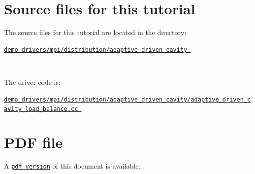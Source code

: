 

\hypertarget{index_sources}{}\section{Source files for this tutorial}\label{index_sources}

\begin{DoxyItemize}
\item The source files for this tutorial are located in the directory\+:~\newline
~\newline
\begin{center} \href{../../../../demo_drivers/mpi/distribution/adaptive_driven_cavity}{\tt demo\+\_\+drivers/mpi/distribution/adaptive\+\_\+driven\+\_\+cavity } \end{center} ~\newline

\item The driver code is\+: ~\newline
~\newline
\begin{center} \href{../../../../demo_drivers/mpi/distribution/adaptive_driven_cavity/adaptive_driven_cavity_load_balance.cc}{\tt demo\+\_\+drivers/mpi/distribution/adaptive\+\_\+driven\+\_\+cavity/adaptive\+\_\+driven\+\_\+cavity\+\_\+load\+\_\+balance.\+cc } \end{center} 
\end{DoxyItemize}



 

 \hypertarget{index_pdf}{}\section{P\+D\+F file}\label{index_pdf}
A \href{../latex/refman.pdf}{\tt pdf version} of this document is available. 
